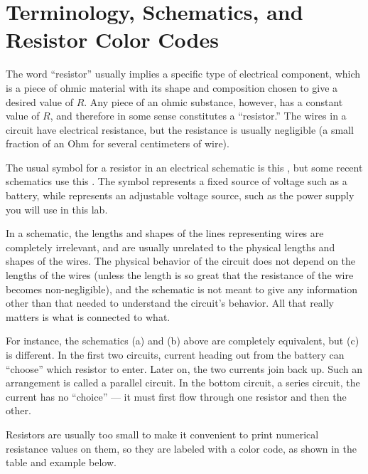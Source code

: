\section*{Terminology, Schematics, and Resistor Color Codes}

The word ``resistor'' usually implies a specific type of
electrical component, which is a piece of ohmic material
with its shape and composition chosen to give a desired
value of $R$. Any piece of an ohmic substance, however, has
a constant value of $R$, and therefore in some sense
constitutes a ``resistor.'' The wires in a circuit have
electrical resistance, but the resistance is usually
negligible (a small fraction of an Ohm for several
centimeters of wire). 

The usual symbol for a resistor in an electrical schematic
is this , but some recent schematics 
use this . The symbol 
represents a fixed source of voltage such as a battery,
while    represents an adjustable voltage source, such as
the power supply you will use in this lab.

In a schematic, the lengths and shapes of the lines
representing wires are completely irrelevant, and are
usually unrelated to the physical lengths and shapes of the
wires. The physical behavior of the circuit does not depend
on the lengths of the wires (unless the length is so great
that the resistance of the wire becomes non-negligible), and
the schematic is not meant to give any information other
than that needed to understand the circuit's behavior. All
that really matters is what is connected to what.


For instance, the schematics (a) and (b) above are
completely equivalent, but (c) is different. In the first
two circuits, current heading out from the battery can
``choose'' which resistor to enter. Later on, the two
currents join back up. Such an arrangement is called a
parallel circuit. In the bottom circuit, a series circuit,
the current has no ``choice'' --- it must first flow through
one resistor and then the other.

Resistors are usually too small to make it convenient to
print numerical resistance values on them, so they are
labeled with a color code, as shown in the table and example below.


